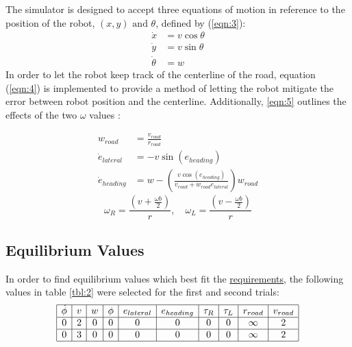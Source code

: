 \documentclass[12pt]{article}
\begin{document}
The simulator is designed to accept three equations of motion in reference to the position of the robot, $(x, y) \mbox{ and } \theta$, defined by (\ref{eqn:3}):
\begin{equation} \label{eqn:3}
    \begin{aligned}
        \dot{x} &= v\cos{\theta} \\
        \dot{y} &= v\sin{\theta} \\
        \dot{\theta} &= w
    \end{aligned}
\end{equation}
In order to let the robot keep track of the centerline of the road, equation (\ref{eqn:4}) is implemented to provide a method of letting the robot mitigate the error between robot position and the centerline.  Additionally, \ref{eqn:5} outlines the effects of the two $\omega$ values \cite{TAM212}:

\begin{equation} \label{eqn:4}
    \begin{aligned}
        w_{road} &= \frac{v_{road}}{r_{road}} \\
        \dot{e}_{lateral} &= -v\sin(e_{heading}) \\
        \dot{e}_{heading} &= w - (\frac{v \cos(e_{heading})}{v_{road} + w_{road}e_{lateral}})w_{road}
    \end{aligned}
\end{equation}
\begin{equation} \label{eqn:5}
    \omega_R = \frac{(v + \frac{\omega b}{2})}{r}, \quad \omega_L = \frac{(v - \frac{\omega b}{2})}{r}
\end{equation}

\subsection{Equilibrium Values} \label{sec:2.2}
In order to find equilibrium values which best fit the \hyperref[sec:1.1]{requirements}, the following values in table \ref{tbl:2} were selected for the first and second trials:
\begin{equation} \label{tbl:2}
    \begin{array}{|c|c|c|c|c|c|c|c|c|c|}
    \hline
    \dot{\phi} & v & w & \phi & e_{lateral} & e_{heading} & \tau_R & \tau_L & r_{road} & v_{road} \\ \hline
    0 & 2 & 0 & 0 & 0 & 0 & 0 & 0 & \infty & 2 \\ \hline
    0 & 3 & 0 & 0 & 0 & 0 & 0 & 0 & \infty & 2 \\ \hline
    \end{array}
\end{equation}
\end{document}

